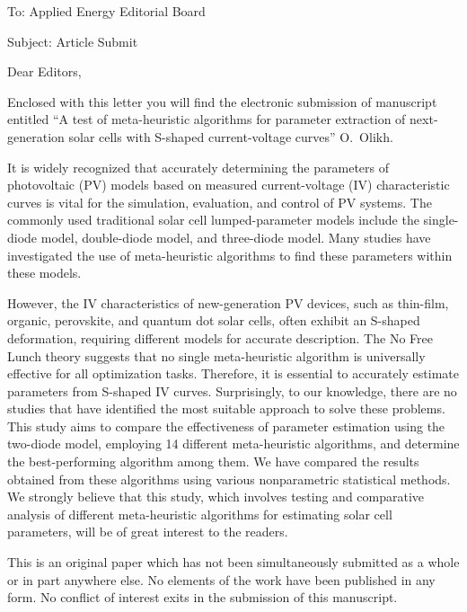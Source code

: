 \documentclass[preprint]{elsarticle}
\begin{document}
To:
Applied Energy Editorial Board


Subject:
Article Submit

\vspace{5mm}
Dear Editors,

\vspace{3mm}
Enclosed with this letter you will find the electronic submission of manuscript entitled
``A test of meta-heuristic algorithms for parameter extraction of next-generation solar cells with S-shaped current-voltage curves'' O.~Olikh.



It is widely recognized that accurately determining the parameters of photovoltaic (PV) models 
based on measured current-voltage (IV) characteristic curves is vital for the simulation, evaluation, and control of PV systems. 
The commonly used traditional solar cell lumped-parameter models include the single-diode model, double-diode model, and three-diode model. 
Many studies have investigated the use of meta-heuristic algorithms to find these parameters within these models.

However, the IV characteristics of new-generation PV devices, such as thin-film, organic, perovskite, and quantum dot solar cells, often exhibit an S-shaped deformation, requiring different models for accurate description. 
The No Free Lunch theory suggests that no single meta-heuristic algorithm is universally effective for all optimization tasks. 
Therefore, it is essential to accurately estimate parameters from S-shaped IV curves. 
Surprisingly, to our knowledge, there are no studies that have identified the most suitable approach to solve these problems. 
This study aims to compare the effectiveness of parameter estimation using the two-diode model, employing 14 different meta-heuristic algorithms, and determine the best-performing algorithm among them.
We have compared the results obtained from these algorithms using various nonparametric statistical methods. 
We strongly believe that this study, which involves testing and comparative analysis of different meta-heuristic algorithms for estimating solar cell parameters, will be of great interest to the readers.


This is an original paper which has not been simultaneously submitted as a whole or in part anywhere else.
No elements of the work have been published in any form.
No conflict of interest exits in the submission of this manuscript.
\end{document}
